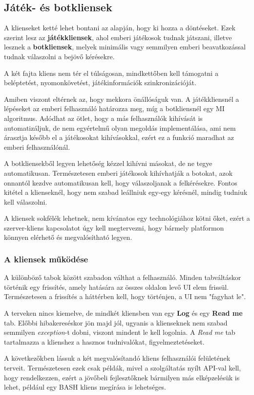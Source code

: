 \documentclass[twoside, a4paper, 12pt]{article}
\begin{document}
\subsection{Játék- és botkliensek}
A klienseket ketté lehet bontani az alapján, hogy ki hozza a döntéseket. Ezek szerint lesz az \textbf{játékkliensek}, ahol emberi játékosok tudnak játszani, illetve lesznek a \textbf{botkliensek}, melyek minimális vagy semmilyen emberi beavatkozással tudnak válaszolni a bejövő kérésekre.

A két fajta kliens nem tér el túlságosan, mindkettőben kell támogatni a beléptetést, nyomonkövetést, játékinformációk szinkronizációját.

Amiben viszont eltérnek az, hogy mekkora önállóságuk van. A játékkliensnél a lépéseket az emberi felhasználó határozza meg, míg a botkliensnél egy MI algoritmus. Adódhat az ötlet, hogy a más felhasználók kihívását is automatizáljuk, de nem egyértelmű olyan megoldás implementálása, ami nem árasztja később el a játékosokat kihívásokkal, ezért ez a funkció maradhat az emberi felhasználónál.

A botkliensekből legyen lehetőség kézzel kihívni másokat, de ne tegye automatikusan. Természetesen emberi játékosok kihívhatják a botokat, azok onnantól kezdve automatikusan kell, hogy válaszoljanak a felkérésekre.
Fontos kitétel a klienseknél, hogy nem szabad leállniuk egy-egy kérésnél, mindig tudniuk kell válaszolni.

A kliensek sokfélék lehetnek, nem kívánatos egy technológiához kötni őket, ezért a szerver-kliens kapcsolatot úgy kell megtervezni, hogy bármely platformon könnyen elérhető és megvalósítható legyen.

\subsubsection{A kliensek működése}
A különböző tabok között szabadon válthat a felhasználó. Minden tabváltáskor történik egy frissítés, amely hatására az összes oldalon levő UI elem frissül. Természetesen a frissítés a háttérben kell, hogy történjen, a UI nem "fagyhat le".

A terveken nincs kiemelve, de mindkét kliensben van egy \textbf{Log} és egy \textbf{Read me} tab. Előbbi hibakereséskor jön majd jól, ugyanis a klienseknek nem szabad semmilyen \textit{exception}-t dobni, viszont mindent le kell logolnia. A \textit{Read me} tab tartalmazza a klienshez a hasznos tudnivalókat, figyelmeztetéseket.

A következőkben lássuk a két megvalósítandó kliens felhasználói felületének terveit. Természetesen ezek csak példák, mivel a szolgáltatás nyílt API-val kell, hogy rendelkezzen, ezért a jövőbeli fejlesztőknek bármilyen más elképzelésük is lehet, például egy BASH kliens megírása is lehetséges.
\end{document}
